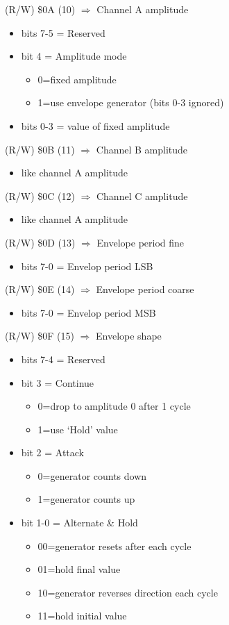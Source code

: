 (R/W) \$0A (10) $\Rightarrow$ Channel A amplitude
\begin{itemize}
\item bits 7-5 = Reserved
\item bit 4 = Amplitude mode
  \begin{itemize}
  \item 0=fixed amplitude
  \item 1=use envelope generator (bits 0-3 ignored)
  \end{itemize}
\item bits 0-3 = value of fixed amplitude
\end{itemize}

(R/W) \$0B (11) $\Rightarrow$ Channel B amplitude
\begin{itemize}
\item[] like channel A amplitude
\end{itemize}

(R/W) \$0C (12) $\Rightarrow$ Channel C amplitude
\begin{itemize}
\item[] like channel A amplitude
\end{itemize}

(R/W) \$0D (13) $\Rightarrow$ Envelope period fine
\begin{itemize}
\item bits 7-0 = Envelop period LSB
\end{itemize}

(R/W) \$0E (14) $\Rightarrow$ Envelope period coarse
\begin{itemize}
\item bits 7-0 = Envelop period MSB
\end{itemize}

(R/W) \$0F (15) $\Rightarrow$ Envelope shape
\begin{itemize}
\item bits 7-4 = Reserved
\item bit 3 = Continue
  \begin{itemize}
  \item 0=drop to amplitude 0 after 1 cycle
  \item 1=use ‘Hold’ value
  \end{itemize}
\item bit 2 = Attack
  \begin{itemize}
  \item 0=generator counts down
  \item 1=generator counts up
  \end{itemize}
\item bit 1-0 = Alternate \& Hold
  \begin{itemize}
  \item 00=generator resets after each cycle
  \item 01=hold final value
  \item 10=generator reverses direction each cycle
  \item 11=hold initial value
  \end{itemize}
\end{itemize}
